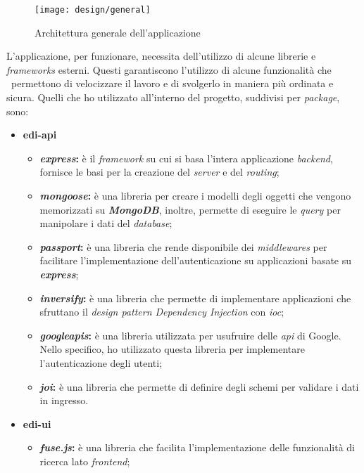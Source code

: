 \begin{figure}[!ht]
  \begin{center}
    \texttt{[image: design/general]}
    \caption{Architettura generale dell'applicazione}
    \label{fig:general-design}
  \end{center}
\end{figure}
\newpage

L'applicazione, per funzionare, necessita dell'utilizzo di alcune librerie e \emph{frameworks} esterni. Questi garantiscono l'utilizzo di alcune funzionalità che \
permettono di velocizzare il lavoro e di svolgerlo in maniera più ordinata e sicura. Quelli che ho utilizzato all'interno del progetto, suddivisi per \emph{package}, sono:
\begin{itemize}
  \item \textbf{edi-api}
    \begin{itemize}
      \item \textbf{\emph{express}:} è il \emph{framework} su cui si basa l'intera applicazione \emph{\gls{backend}}, fornisce le basi per la creazione del \emph{server} e del \emph{routing};
      \item \textbf{\emph{mongoose}:} è una libreria per creare i modelli degli oggetti che vengono memorizzati su \emph{\textbf{MongoDB}}, inoltre, permette di eseguire le \emph{query} per manipolare i dati del \emph{database};
      \item \textbf{\emph{passport}:} è una libreria che rende disponibile dei \emph{middlewares} per facilitare l'implementazione dell'autenticazione su applicazioni basate su \emph{\textbf{express}};
      \item \textbf{\emph{inversify}:} è una libreria che permette di implementare applicazioni che sfruttano il \emph{design pattern Dependency Injection} con \emph{\acrfull{ioc}};
      \item \textbf{\emph{googleapis}:} è una libreria utilizzata per usufruire delle \emph{\acrshort{api}} di Google. Nello specifico, ho utilizzato questa libreria per implementare l'autenticazione degli utenti;
      \item \textbf{\emph{joi}:} è una libreria che permette di definire degli schemi per validare i dati in ingresso.
    \end{itemize}
  \item \textbf{edi-ui}
    \begin{itemize}
      \item \textbf{\emph{fuse.js}:} è una libreria che facilita l'implementazione delle funzionalità di ricerca lato \emph{\gls{frontend}};

\end{itemize}
\end{itemize}
